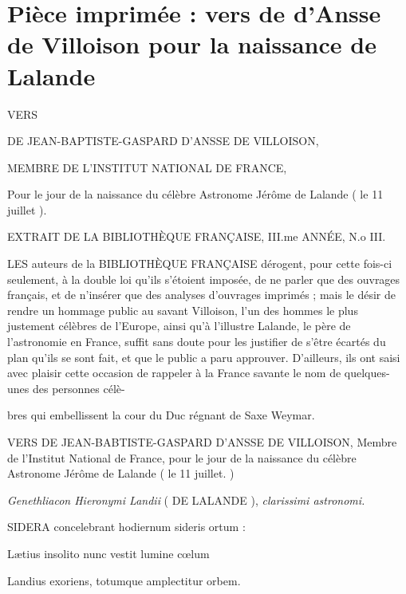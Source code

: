 \documentclass[11pt,a4paper]{article}
\begin{document}
\section{Pièce imprimée : vers de d'Ansse de Villoison pour la naissance de Lalande}


VERS

DE JEAN-BAPTISTE-GASPARD D'ANSSE DE VILLOISON,

MEMBRE DE L'INSTITUT NATIONAL DE FRANCE,

Pour le jour de la naissance du célèbre Astronome Jérôme de Lalande ( le 11 juillet ).


EXTRAIT DE LA BIBLIOTHÈQUE FRANÇAISE, III.me ANNÉE, N.o III.

LES auteurs de la BIBLIOTHÈQUE FRANÇAISE dérogent, pour cette fois-ci seulement, à la double loi qu'ils s'étoient imposée, de ne parler que des ouvrages français, et de n'insérer que des analyses d'ouvrages imprimés ; mais le désir de rendre un hommage public au savant Villoison, l'un des hommes le plus justement célèbres de l'Europe, ainsi qu'à l'illustre Lalande, le père de l'astronomie en France, suffit sans doute pour les justifier de s'être écartés du plan qu'ils se sont fait, et que le public a paru approuver. D'ailleurs, ils ont saisi avec plaisir cette occasion de rappeler à la France savante le nom de quelques-unes des personnes célè-


bres qui embellissent la cour du Duc régnant de Saxe Weymar.

VERS DE JEAN-BABTISTE-GASPARD D'ANSSE DE VILLOISON, Membre de l'Institut National de France, pour le jour de la naissance du célèbre Astronome Jérôme de Lalande ( le 11 juillet. )

\emph{Genethliacon Hieronymi Landii} ( DE LALANDE ), \emph{clarissimi astronomi.}

SIDERA concelebrant hodiernum sideris ortum :

Lætius insolito nunc vestit lumine cœlum

Landius exoriens, totumque amplectitur orbem.
\end{document}

